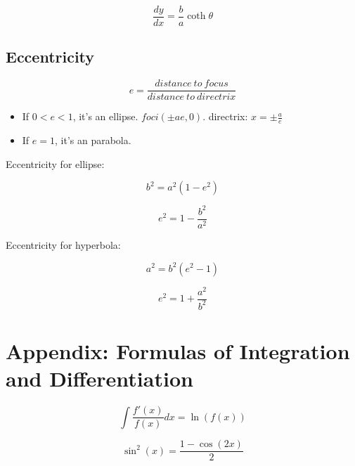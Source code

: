 \documentclass[a4paper,9pt]{scrartcl}
\begin{document}
    \begin{displaymath}
        \frac{dy}{dx} = \frac{b}{a}\coth\theta
    \end{displaymath}

    \subsection{Eccentricity}

    \begin{displaymath}
        e = \frac{distance\ to\ focus}{distance\ to\ directrix}
    \end{displaymath}

    \begin{itemize}
        \item If $0 < e < 1$, it's an ellipse.
        $foci({\pm}ae, 0)$.
        directrix: $x = \pm\frac{a}{e}$
        \item If $e = 1$, it's an parabola.
    \end{itemize}

    Eccentricity for ellipse:

    \begin{displaymath}
        b^2 = a^2(1-e^2)
    \end{displaymath}

    \begin{displaymath}
        e^2 = 1 - \frac{b^2}{a^2}
    \end{displaymath}

    Eccentricity for hyperbola:

    \begin{displaymath}
        a^2 = b^2(e^2-1)
    \end{displaymath}

    \begin{displaymath}
        e^2 = 1 + \frac{a^2}{b^2}
    \end{displaymath}


    \section{Appendix: Formulas of Integration and Differentiation}

    \begin{displaymath}
        \int \frac{f'(x)}{f(x)} dx = \ln(f(x))
    \end{displaymath}

    \begin{displaymath}
        \sin^2(x) = \frac{1-\cos(2x)}{2}
    \end{displaymath}
\end{document}
